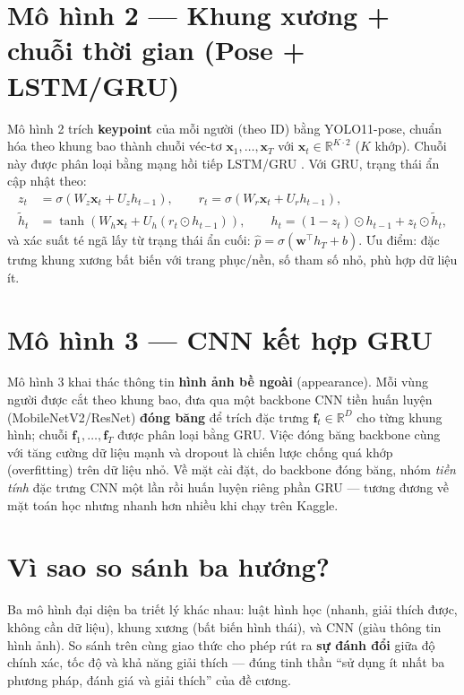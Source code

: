 \documentclass[fontsize=13pt,a4paper,oneside,DIV=calc,chapterprefix=true]{scrbook}
\begin{document}
\section{Mô hình 2 --- Khung xương + chuỗi thời gian (Pose + LSTM/GRU)}
Mô hình 2 trích \textbf{keypoint} của mỗi người (theo ID) bằng YOLO11-pose, chuẩn hóa theo khung bao thành chuỗi véc-tơ $\mathbf{x}_1, \dots, \mathbf{x}_T$ với $\mathbf{x}_t \in \mathbb{R}^{K\cdot 2}$ ($K$ khớp). Chuỗi này được phân loại bằng mạng hồi tiếp LSTM/GRU \cite{lstm}. Với GRU, trạng thái ẩn cập nhật theo:
\begin{align}
z_t &= \sigma(W_z \mathbf{x}_t + U_z h_{t-1}), \qquad r_t = \sigma(W_r \mathbf{x}_t + U_r h_{t-1}),\\
\tilde{h}_t &= \tanh(W_h \mathbf{x}_t + U_h (r_t \odot h_{t-1})), \qquad
h_t = (1 - z_t)\odot h_{t-1} + z_t \odot \tilde{h}_t,
\end{align}
và xác suất té ngã lấy từ trạng thái ẩn cuối: $\hat{p} = \sigma(\mathbf{w}^\top h_T + b)$. Ưu điểm: đặc trưng khung xương bất biến với trang phục/nền, số tham số nhỏ, phù hợp dữ liệu ít.

\section{Mô hình 3 --- CNN kết hợp GRU}
Mô hình 3 khai thác thông tin \textbf{hình ảnh bề ngoài} (appearance). Mỗi vùng người được cắt theo khung bao, đưa qua một backbone CNN tiền huấn luyện (MobileNetV2/ResNet) \textbf{đóng băng} để trích đặc trưng $\mathbf{f}_t \in \mathbb{R}^{D}$ cho từng khung hình; chuỗi $\mathbf{f}_1,\dots,\mathbf{f}_T$ được phân loại bằng GRU. Việc đóng băng backbone cùng với tăng cường dữ liệu mạnh và dropout là chiến lược chống quá khớp (overfitting) trên dữ liệu nhỏ. Về mặt cài đặt, do backbone đóng băng, nhóm \emph{tiền tính} đặc trưng CNN một lần rồi huấn luyện riêng phần GRU --- tương đương về mặt toán học nhưng nhanh hơn nhiều khi chạy trên Kaggle.

\section{Vì sao so sánh ba hướng?}
Ba mô hình đại diện ba triết lý khác nhau: luật hình học (nhanh, giải thích được, không cần dữ liệu), khung xương (bất biến hình thái), và CNN (giàu thông tin hình ảnh). So sánh trên cùng giao thức cho phép rút ra \textbf{sự đánh đổi} giữa độ chính xác, tốc độ và khả năng giải thích --- đúng tinh thần ``sử dụng ít nhất ba phương pháp, đánh giá và giải thích'' của đề cương.
\end{document}
